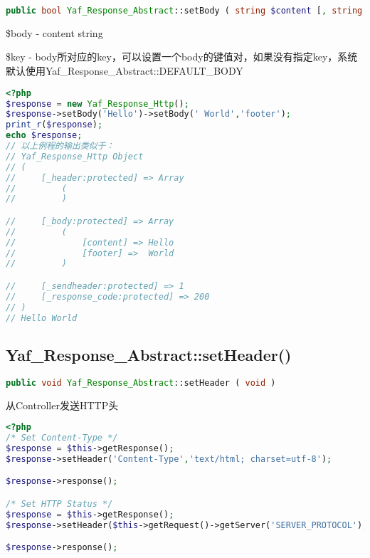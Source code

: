 \begin{lstlisting}[language=PHP]
public bool Yaf_Response_Abstract::setBody ( string $content [, string $key ] )
\end{lstlisting}

\begin{compactitem}
\item \$body - content string
\item \$key - body所对应的key，可以设置一个body的键值对，如果没有指定key，系统默认使用Yaf\_Response\_Abstract::DEFAULT\_BODY
\end{compactitem}


\begin{lstlisting}[language=PHP]
<?php
$response = new Yaf_Response_Http();
$response->setBody('Hello')->setBody(' World','footer');
print_r($response);
echo $response;
// 以上例程的输出类似于：
// Yaf_Response_Http Object
// (
//     [_header:protected] => Array
//         (
//         )

//     [_body:protected] => Array
//         (
//             [content] => Hello
//             [footer] =>  World
//         )

//     [_sendheader:protected] => 1
//     [_response_code:protected] => 200
// )
// Hello World
\end{lstlisting}

\subsection{Yaf\_Response\_Abstract::setHeader()}


\begin{lstlisting}[language=PHP]
public void Yaf_Response_Abstract::setHeader ( void )
\end{lstlisting}

\begin{example}
从Controller发送HTTP头
\begin{lstlisting}[language=PHP]
<?php
/* Set Content-Type */
$response = $this->getResponse();
$response->setHeader('Content-Type','text/html; charset=utf-8');

$response->response();

/* Set HTTP Status */
$response = $this->getResponse();
$response->setHeader($this->getRequest()->getServer('SERVER_PROTOCOL'),'404 NOT FOUND');

$response->response();
\end{lstlisting}
\end{example}

